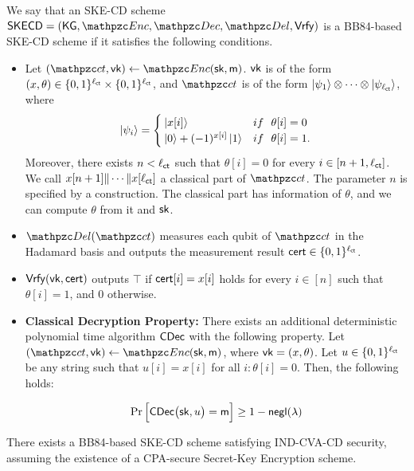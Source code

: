 \begin{definition}\label{def:bb84}
We say that an SKE-CD scheme $\CDSKE=(\KG,\qEnc,\qDec,\qDel,\Vrfy)$
is a BB84-based SKE-CD scheme if it satisfies the following
conditions.

\begin{itemize}
   \item Let $(\qct,\vk)\gets\qEnc(\sk,\msg)$. $\mathsf{vk}$ is of the form
    $(x,\theta)\in\{0,1\}^{\ell_{\mathsf{ct}}}\times\{0,1\}^{\ell_{\mathsf{ct}}}$,
    and $\qct$ is of the form $\ket{\psi_1}\otimes
    \cdots \otimes\ket{\psi_{\ell_{\mathsf{ct}}}}$, where
    \begin{align}
    \ket{\psi_i}=
    \begin{cases}
        \ket{x[i]} & if~~ \theta[i]=0\\
        \ket{0}+(-1)^{x[i]}\ket{1} & if~~ \theta[i]=1.
    \end{cases}
    \end{align}
    Moreover, there exists $n<\ell_{\mathsf{ct}}$ such that $\theta[i]=0$ for every $i\in[n+1,\ell_{\mathsf{ct}}]$. We call $x[n+1]\|\cdots\|x[\ell_{\mathsf{ct}}]$ a classical part of $\qct$. The parameter $n$ is specified by a construction. The classical part has information of $\theta$, and we can compute $\theta$ from it and $\mathsf{sk}$.

    
        \item $\qDel(\qct)$ measures each qubit of $\qct$ in the
    Hadamard basis and outputs the measurement result
    $\mathsf{cert}\in\{0,1\}^{\ell_{\mathsf{ct}}}$.

    
    \item $\mathsf{Vrfy}(\mathsf{vk},\mathsf{cert})$ outputs $\top$ if $\mathsf{cert}[i]=x[i]$ holds
    for every $i\in[n]$ such that $\theta[i]=1$, and $0$
    otherwise.

\item \textbf{Classical Decryption Property:} There exists an
additional deterministic polynomial time algorithm $\mathsf{CDec}$ with the
following property. Let $(\qct,\vk)\gets\qEnc(\sk,\msg)$, where $\mathsf{vk}=(x,\theta)$. Let $u\in\{0,1\}^{\ell_{\mathsf{ct}}}$ be any string such that $u[i] =x[i]$ for all $i : \theta[i] = 0$. Then, the following holds:

$$\Pr\Big[\mathsf{CDec}\big(\mathsf{sk}, u\big)= \mathsf{m}\Big] \ge 1 - {\mathsf{negl}}(\lambda)$$ 

\end{itemize}
\end{definition}

\begin{theorem}\label{thm:SKECD-BB84}
There exists a BB84-based SKE-CD scheme satisfying IND-CVA-CD
security, assuming the existence of a CPA-secure Secret-Key
Encryption scheme.
\end{theorem}



